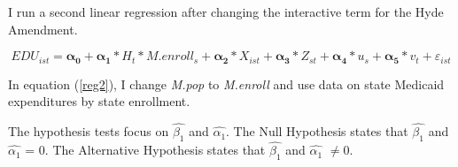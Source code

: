         I run a second linear regression after changing the interactive term for the Hyde Amendment.

        \begin{equation}\label{reg2}
            EDU_{ist} = \boldsymbol{\alpha_{0}} + \boldsymbol{\alpha_{1}}*H_{t}*M.enroll_{s} + \boldsymbol{\alpha_{2}}*X_{ist} + \boldsymbol{\alpha_{3}}*Z_{st} + \boldsymbol{\alpha_{4}}*u_{s} + \boldsymbol{\alpha_{5}}*v_{t} + \varepsilon _{ist}
        \end{equation}

        In equation (\ref{reg2}), I change \textit{M.pop} to \textit{M.enroll} and use data on state Medicaid expenditures by state enrollment.

        The hypothesis tests focus on $\widehat{\beta_{1}}$ and $\widehat{\alpha_{1}}$. The Null Hypothesis states that $\widehat{\beta_{1}}$ and $\widehat{\alpha_{1}}$ = 0. The Alternative Hypothesis states that $\widehat{\beta_{1}}$ and $\widehat{\alpha_{1}}$ $\neq 0$.
